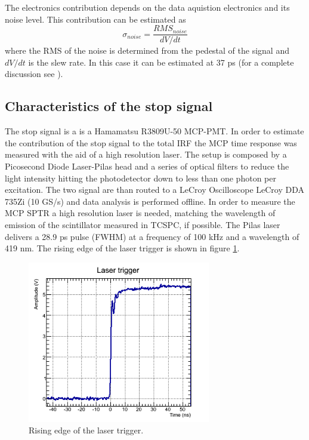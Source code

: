 The electronics contribution depends on the data aquistion electronics and its noise level. This contribution can be estimated as
\begin{equation}
\sigma _{noise} = \frac{RMS _{noise}}{dV/dt}
\end{equation}
where the RMS of the noise is determined from the pedestal of the signal and $dV/dt$ is the slew rate. In this case it can be estimated at 37 ps (for a complete discussion see \cite{Gundacker2014}). 

\subsection{Characteristics of the stop signal}
The stop signal is a is a Hamamatsu R3809U-50 MCP-PMT. In order to estimate the contribution of the stop signal to the total IRF the MCP time response was measured with the aid of a high resolution laser.
The setup is composed by a Picosecond Diode Laser-Pilas head and a series of optical filters to reduce the light intensity hitting the photodetector down to less than one photon per excitation. The two signal are than routed to a LeCroy Oscilloscope LeCroy DDA 735Zi (10 GS/s) and data analysis is performed offline.
In order to measure the MCP SPTR a high resolution laser is needed, matching the wavelength of emission of the scintillator measured in TCSPC, if possible. The Pilas laser delivers a 28.9 ps pulse (FWHM) at a frequency of 100 kHz and a wavelength of 419 nm. The rising edge of the laser trigger is shown in figure \ref{fig:trigger}.
\begin{figure}[htbp]
\begin{center}
\includegraphics[width=8cm]{../Pictures/Chapter_8/laser_trigger.png}
\end{center}
\caption[Laser trigger]{Rising edge of the laser trigger.}
\label{fig:trigger}
\end{figure}
